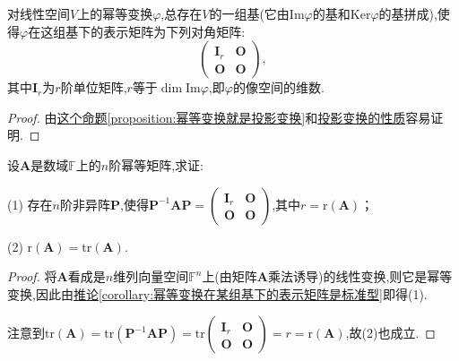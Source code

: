 \documentclass[../../main.tex]{subfiles}%
\begin{document}
\begin{corollary}\label{corollary:幂等变换在某组基下的表示矩阵是标准型}
对线性空间\(V\)上的幂等变换\(\varphi\),总存在\(V\)的一组基(它由\(\mathrm{Im}\varphi\)的基和\(\mathrm{Ker}\varphi \)的基拼成),使得\(\varphi\)在这组基下的表示矩阵为下列对角矩阵:
\[
\begin{pmatrix}
\boldsymbol{I}_r&\boldsymbol{O}\\
\boldsymbol{O}&\boldsymbol{O}
\end{pmatrix},
\]
其中\(\boldsymbol{I}_r\)为\(r\)阶单位矩阵,\(r\)等于\(\dim \mathrm{Im}\varphi\),即\(\varphi\)的像空间的维数.
\end{corollary}
\begin{proof}

由\hyperref[proposition:幂等变换就是投影变换]{这个命题\ref{proposition:幂等变换就是投影变换}}和\hyperref[proposition:投影变换的性质]{投影变换的性质}容易证明.

\end{proof}

\begin{proposition}\label{proposition:幂等矩阵的性质1}
设\(\boldsymbol{A}\)是数域\(\mathbb{F}\)上的\(n\)阶幂等矩阵,求证:

(1) 存在\(n\)阶非异阵\(\boldsymbol{P}\),使得\(\boldsymbol{P}^{-1}\boldsymbol{A}\boldsymbol{P}=\begin{pmatrix}\boldsymbol{I}_r&\boldsymbol{O}\\ \boldsymbol{O}&\boldsymbol{O}\end{pmatrix}\),其中\(r = \text{r}(\boldsymbol{A})\)；

(2) \(\text{r}(\boldsymbol{A})=\text{tr}(\boldsymbol{A})\).
\end{proposition}
\begin{proof}

将\(\boldsymbol{A}\)看成是\(n\)维列向量空间\(\mathbb{F}^n\)上(由矩阵$\boldsymbol{A}$乘法诱导)的线性变换,则它是幂等变换,因此由\hyperref[corollary:幂等变换在某组基下的表示矩阵是标准型]{推论\ref{corollary:幂等变换在某组基下的表示矩阵是标准型}}即得(1). 

注意到\(\text{tr}(\boldsymbol{A})=\text{tr}(\boldsymbol{P}^{-1}\boldsymbol{A}\boldsymbol{P})=\text{tr}\begin{pmatrix}\boldsymbol{I}_r&\boldsymbol{O}\\ \boldsymbol{O}&\boldsymbol{O}\end{pmatrix}=r = \text{r}(\boldsymbol{A})\),故(2)也成立.

\end{proof}
\end{document}
